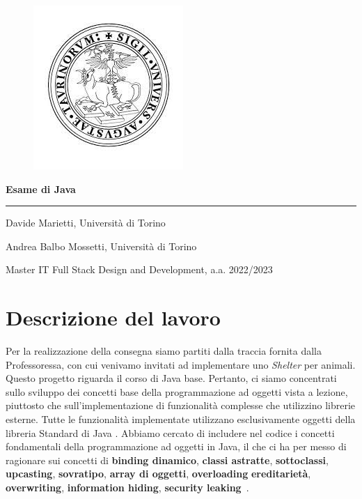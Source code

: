 \documentclass[a4paper,11pt]{article}
\newcommand{\linia}{\rule{\linewidth}{0.5pt}}
\begin{document}
\begin{figure}
    \centering
    \includegraphics[width=0.25\linewidth]{immagini/unito_logo.jpg}
\end{figure}

\begin{center}
    \vspace{5ex}
    {\huge \textbf{Esame di Java}}
    \vspace{1ex}
    \linia
    \vspace{3ex}
\end{center}

\begin{center}
 Davide Marietti, Università di Torino
\end{center}
\begin{center}
    Andrea Balbo Mossetti, Università di Torino
\end{center}

\vspace{5ex}

\begin{center}
    Master IT Full Stack Design and Development, a.a. 2022/2023

\end{center}

\newpage
	\tableofcontents
    \lstlistoflistings
	
\newpage


\section{Descrizione del lavoro}

Per la realizzazione della consegna siamo partiti dalla traccia fornita dalla Professoressa, con cui venivamo invitati ad implementare uno \textit{Shelter} per animali. Questo progetto riguarda il corso di Java base. Pertanto, ci siamo concentrati sullo sviluppo dei concetti base della programmazione ad oggetti vista a lezione, piuttosto che sull'implementazione di funzionalità complesse che utilizzino librerie esterne. Tutte le funzionalità implementate utilizzano esclusivamente oggetti della libreria Standard di Java \cite{java_lib}. Abbiamo cercato di includere nel codice i concetti fondamentali della programmazione ad oggetti in Java, il che ci ha per messo di ragionare sui concetti di \textbf{binding dinamico}, \textbf{classi astratte}, \textbf{sottoclassi}, \textbf{upcasting}, \textbf{sovratipo}, \textbf{array di oggetti}, \textbf{overloading} \textbf{ereditarietà}, \textbf{overwriting}, \textbf{information hiding}, \textbf{security leaking}~\cite{java}\cite{java_book}.
\end{document}
